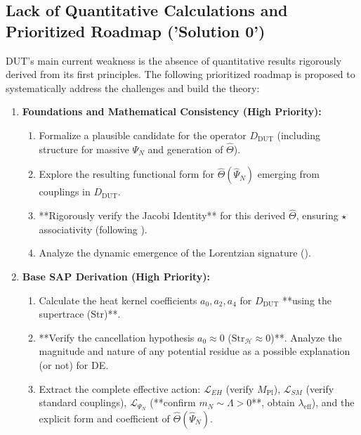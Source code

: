 \documentclass[11pt, a4paper]{article}
\theoremstyle{remark}
\newcommand{\Op}[1]{\hat{#1}}
\newcommand{\Star}{\star}
\newcommand{\Str}{\mathrm{Str}}
\begin{document}
\subsection{Lack of Quantitative Calculations and Prioritized Roadmap ('Solution 0')}
\label{subsec:quantitative_roadmap_detailed}

DUT's main current weakness is the absence of quantitative results rigorously derived from its first principles. The following prioritized roadmap is proposed to systematically address the challenges and build the theory:

\begin{enumerate}[label=\textbf{Phase \arabic*}:, wide, labelwidth=!, labelindent=0pt, itemsep=2pt, topsep=3pt]
    \item \textbf{Foundations and Mathematical Consistency (High Priority):}
        \begin{enumerate}[label=\alph*), itemsep=1pt]
            \item Formalize a plausible candidate for the operator \( D_{\text{DUT}} \) (including structure for massive \( \Psi_N \) and generation of \( \Op{\Theta} \)).
            \item Explore the resulting functional form for \( \Op{\Theta}(\Op{\Psi}_N) \) emerging from couplings in \( D_{\text{DUT}} \).
            \item **Rigorously verify the Jacobi Identity** for this derived \( \Op{\Theta} \), ensuring \( \Star \) associativity (following ).
            \item Analyze the dynamic emergence of the Lorentzian signature ().
        \end{enumerate}
    \item \textbf{Base SAP Derivation (High Priority):}
        \begin{enumerate}[label=\alph*), itemsep=1pt]
            \item Calculate the heat kernel coefficients \( a_0, a_2, a_4 \) for \( D_{\text{DUT}} \) **using the supertrace (\( \Str \))**.
            \item **Verify the cancellation hypothesis \( a_0 \approx 0 \) (\( \Str_{\mathcal{H}} \approx 0 \))**. Analyze the magnitude and nature of any potential residue as a possible explanation (or not) for DE.
            \item Extract the complete effective action: \( \mathcal{L}_{EH} \) (verify \( M_{\text{Pl}} \)), \( \mathcal{L}_{SM} \) (verify standard couplings), \( \mathcal{L}_{\Psi_N} \) (**confirm \( m_N \sim \Lambda > 0 \)**, obtain \( \lambda_{\text{eff}} \)), and the explicit form and coefficient of \( \Op{\Theta}(\Op{\Psi}_N) \).

\end{enumerate}
\end{enumerate}
\end{document}
